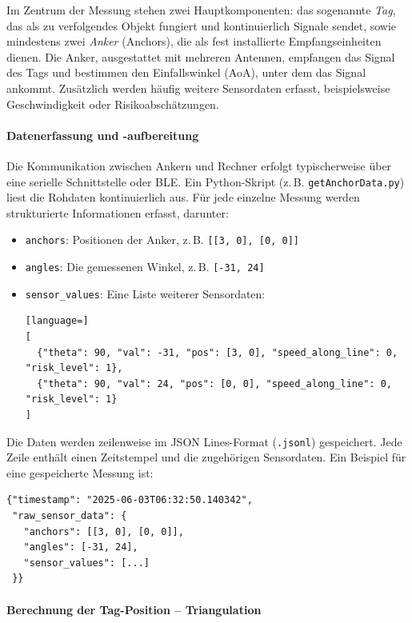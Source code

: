 \documentclass[a4paper, 12pt]{article} %
\begin{document}
Im Zentrum der Messung stehen zwei Hauptkomponenten: das sogenannte \textit{Tag}, das als zu verfolgendes Objekt fungiert 
und kontinuierlich Signale sendet, sowie mindestens zwei \textit{Anker} (Anchors), die als fest installierte Empfangseinheiten dienen. 
Die Anker, ausgestattet mit mehreren Antennen, empfangen das Signal des Tags und bestimmen den Einfallswinkel (\acf{AoA}), unter dem 
das Signal ankommt. Zusätzlich werden häufig weitere Sensordaten erfasst, beispielsweise Geschwindigkeit oder Risikoabschätzungen.

\paragraph{Datenerfassung und -aufbereitung}

Die Kommunikation zwischen Ankern und Rechner erfolgt typischerweise über eine serielle Schnittstelle oder \ac{BLE}. 
Ein Python-Skript (z.\,B. \texttt{getAnchorData.py}) liest die Rohdaten kontinuierlich aus. Für jede einzelne Messung werden strukturierte Informationen
erfasst, darunter:

\begin{itemize}
    \item \texttt{anchors}: Positionen der Anker, z.\,B. \texttt{[[3, 0], [0, 0]]}
    \item \texttt{angles}: Die gemessenen Winkel, z.\,B. \texttt{[-31, 24]}
    \item \texttt{sensor\_values}: Eine Liste weiterer Sensordaten:
\begin{lstlisting}[language=]
[
  {"theta": 90, "val": -31, "pos": [3, 0], "speed_along_line": 0, "risk_level": 1},
  {"theta": 90, "val": 24, "pos": [0, 0], "speed_along_line": 0, "risk_level": 1}
]
\end{lstlisting}
\end{itemize}

Die Daten werden zeilenweise im \ac{JSON} Lines-Format (\texttt{.jsonl}) gespeichert. Jede Zeile enthält einen Zeitstempel und die zugehörigen Sensordaten. 
Ein Beispiel für eine gespeicherte Messung ist:

\begin{verbatim}
{"timestamp": "2025-06-03T06:32:50.140342", 
 "raw_sensor_data": {
   "anchors": [[3, 0], [0, 0]], 
   "angles": [-31, 24], 
   "sensor_values": [...]
 }}
\end{verbatim}

\paragraph{Berechnung der Tag-Position – Triangulation}
\end{document}

